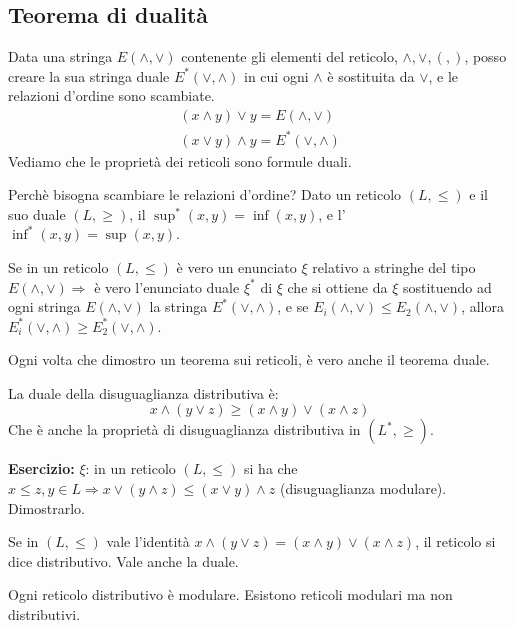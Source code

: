 \subsection{Teorema di dualit\`a}
Data una stringa $E(\wedge, \vee)$ contenente gli elementi del reticolo, $\wedge, \vee, (, )$, posso creare la sua stringa duale $E^{\ast} (\vee, \wedge)$ in cui ogni $\wedge$ \`e sostituita da $\vee$, e le relazioni d'ordine sono scambiate.
\begin{gather*}
(x \wedge y) \vee y = E(\wedge, \vee) \\
(x \vee y) \wedge y = E^{\ast} (\vee, \wedge)
\end{gather*}
Vediamo che le propriet\`a dei reticoli sono formule duali.

Perch\`e bisogna scambiare le relazioni d'ordine? Dato un reticolo $(L, \le)$ e il suo duale $(L, \ge)$, il $\sup^{\ast} (x,y) = \inf(x,y)$, e l'$\inf^{\ast}(x,y) = \sup(x,y)$.

\begin{theorem}
Se in un reticolo $(L, \le)$ \`e vero un enunciato $\xi$ relativo a stringhe del tipo $E(\wedge, \vee) \Rightarrow $ \`e vero l'enunciato duale $\xi^{\ast}$ di $\xi$ che si ottiene da $\xi$ sostituendo ad ogni stringa $E(\wedge, \vee)$ la stringa $E^{\ast}(\vee, \wedge)$, e se $E_i (\wedge, \vee) \le E_2 (\wedge, \vee)$, allora $E_i^{\ast} (\vee, \wedge) \ge E_2^{\ast} (\vee, \wedge)$.
\end{theorem}
Ogni volta che dimostro un teorema sui reticoli, \`e vero anche il teorema duale. 

La duale della disuguaglianza distributiva \`e:
\[
x \wedge (y \vee z) \ge (x \wedge y) \vee (x \wedge z)
\]
Che \`e anche la propriet\`a di disuguaglianza distributiva in $(L^{\ast}, \ge)$.

\textbf{Esercizio:} $\xi$: in un reticolo $(L, \le)$ si ha che $x \le z, y \in L \Rightarrow x \vee (y \wedge z) \le (x \vee y) \wedge z$ (disuguaglianza modulare). Dimostrarlo.

\vspace{5cm}

\begin{defn}
Se in $(L, \le)$ vale l'identit\`a $x \wedge (y \vee z) = (x \wedge y) \vee (x \wedge z)$, il reticolo si dice distributivo. Vale anche la duale.
\end{defn}

Ogni reticolo distributivo \`e modulare. Esistono reticoli modulari ma non distributivi.

